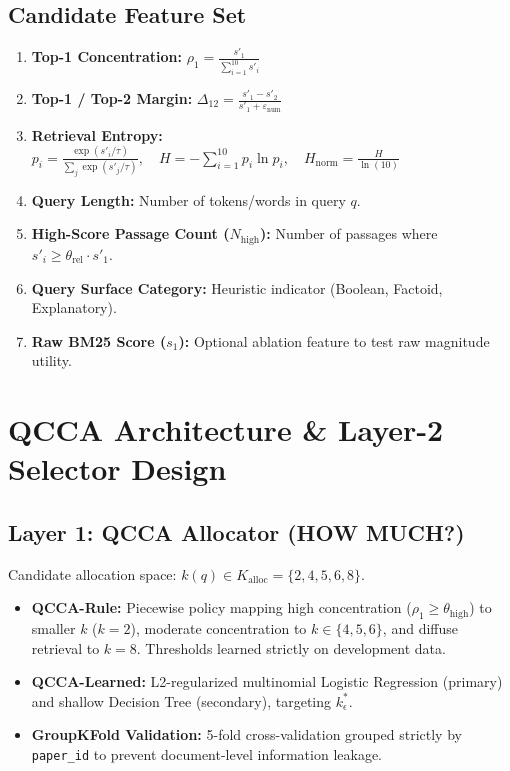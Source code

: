 \documentclass[11pt,a4paper]{article}
\begin{document}
\subsection{Candidate Feature Set}
\begin{enumerate}
    \item \textbf{Top-1 Concentration:} $\rho_1 = \frac{s'_1}{\sum_{i=1}^{10} s'_i}$
    \item \textbf{Top-1 / Top-2 Margin:} $\Delta_{12} = \frac{s'_1 - s'_2}{s'_1 + \varepsilon_{\text{num}}}$
    \item \textbf{Retrieval Entropy:} $p_i = \frac{\exp(s'_i / \tau)}{\sum_j \exp(s'_j / \tau)}, \quad H = -\sum_{i=1}^{10} p_i \ln p_i, \quad H_{\text{norm}} = \frac{H}{\ln(10)}$
    \item \textbf{Query Length:} Number of tokens/words in query $q$.
    \item \textbf{High-Score Passage Count ($N_{\text{high}}$):} Number of passages where $s'_i \ge \theta_{\text{rel}} \cdot s'_1$.
    \item \textbf{Query Surface Category:} Heuristic indicator (Boolean, Factoid, Explanatory).
    \item \textbf{Raw BM25 Score ($s_1$):} Optional ablation feature to test raw magnitude utility.
\end{enumerate}

\section{QCCA Architecture \& Layer-2 Selector Design}

\subsection{Layer 1: QCCA Allocator (HOW MUCH?)}
Candidate allocation space: $k(q) \in K_{\text{alloc}} = \{2, 4, 5, 6, 8\}$.
\begin{itemize}
    \item \textbf{QCCA-Rule:} Piecewise policy mapping high concentration ($\rho_1 \ge \theta_{\text{high}}$) to smaller $k$ ($k=2$), moderate concentration to $k \in \{4, 5, 6\}$, and diffuse retrieval to $k=8$. Thresholds learned strictly on development data.
    \item \textbf{QCCA-Learned:} L2-regularized multinomial Logistic Regression (primary) and shallow Decision Tree (secondary), targeting $k^*_\epsilon$.
    \item \textbf{GroupKFold Validation:} 5-fold cross-validation grouped strictly by \texttt{paper\_id} to prevent document-level information leakage.
\end{itemize}
\end{document}

